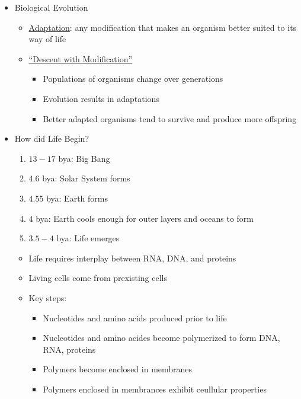 \documentclass[12pt]{article}
\begin{document}
\begin{itemize}
\begin{itemize}
\begin{itemize}
            \end{itemize}
        \end{itemize}
        \item Biological Evolution
        \begin{itemize}
            \item \underline{Adaptation}: any modification that makes an organism better suited to its way of life
            \item \underline{``Descent with Modification''}
            \begin{itemize}
                \item Populations of organisms change over generations
                \item Evolution results in adaptations
                \item Better adapted organisms tend to survive and produce more offspring
            \end{itemize}
        \end{itemize}
        \item How did Life Begin?
        \begin{enumerate}
            \item $13-17$ bya: Big Bang
            \item $4.6$ bya: Solar System forms
            \item $4.55$ bya: Earth forms
            \item $4$ bya: Earth cools enough for outer layers and oceans to form
            \item $3.5-4$ bya: Life emerges
        \end{enumerate}
        \begin{itemize}
            \item Life requires interplay between RNA, DNA, and proteins
            \item Living cells come from prexisting cells
            \item Key steps:
            \begin{itemize}
                \item Nucleotides and amino acids produced prior to life
                \item Nucleotides and amino acides become polymerized to form DNA, RNA, proteins
                \item Polymers become enclosed in membranes
                \item Polymers enclosed in membrances exhibit ceullular properties
            \end{itemize}

\end{itemize}
\end{itemize}
\end{document}
